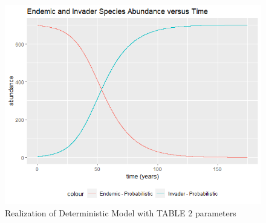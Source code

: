\documentclass[twocolumn,prb,amsmath,amssymb,amsfonts,nobalancelastpage]{revtex4}
\begin{document}
\begin{figure}[ht]
    \centering
    \includegraphics[scale=0.53]{determExample.png}
    \caption{Realization of Deterministic Model with TABLE 2 parameters}
    \label{fig:my_label}
\end{figure}
\end{document}
